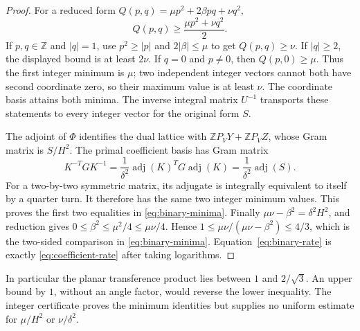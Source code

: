 \documentclass[11pt]{article}
\theoremstyle{remark}
\newcommand{\Z}{\mathbb Z}
\begin{document}
\begin{proof}
For a reduced form \(Q(p,q)=\mu p^2+2\beta pq+\nu q^2\),
\[
 Q(p,q)\ge\frac{\mu p^2+\nu q^2}{2}.
\]
If \(p,q\in\Z\) and \(|q|=1\), use
\(p^2\ge|p|\) and \(2|\beta|\le\mu\) to get \(Q(p,q)\ge\nu\).
If \(|q|\ge2\), the displayed bound is at least \(2\nu\).
If \(q=0\) and \(p\ne0\), then \(Q(p,0)\ge\mu\).
Thus the first integer minimum is \(\mu\); two independent integer
vectors cannot both have second coordinate zero, so their maximum
value is at least \(\nu\). The coordinate basis attains both minima.
The inverse integral matrix \(U^{-1}\) transports these statements to
every integer vector for the original form \(S\).

The adjoint of \(\Phi\) identifies the dual lattice with
\(\Z P_VY+\Z P_VZ\), whose Gram matrix is \(S/H^2\).
The primal coefficient basis has Gram matrix
\[
 K^{-T}GK^{-1}
   =\frac1{\delta^2}\operatorname{adj}(K)^TG\operatorname{adj}(K)
   =\frac1{\delta^2}\operatorname{adj}(S).
\]
For a two-by-two symmetric matrix, its adjugate is integrally equivalent
to itself by a quarter turn. It therefore has the same two integer
minimum values. This proves the first two equalities in
\eqref{eq:binary-minima}. Finally
\(\mu\nu-\beta^2=\delta^2H^2\), and reduction gives
\(0\le\beta^2\le\mu^2/4\le\mu\nu/4\).
Hence \(1\le\mu\nu/(\mu\nu-\beta^2)\le4/3\), which is the
two-sided comparison in \eqref{eq:binary-minima}.
Equation~\eqref{eq:binary-rate} is exactly
\eqref{eq:coefficient-rate} after taking logarithms.
\end{proof}

In particular the planar transference product lies between \(1\) and
\(2/\sqrt3\). An upper bound by \(1\), without an angle factor, would
reverse the lower inequality. The integer certificate proves the
minimum identities but supplies no uniform estimate for \(\mu/H^2\)
or \(\nu/\delta^2\).
\end{document}
